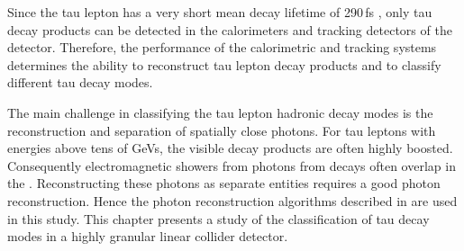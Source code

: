 Since the tau lepton has a very short mean decay lifetime of 290\,fs \cite{Abreu:1991jn}, only tau decay products can be detected in the calorimeters and tracking detectors of the \ILD detector. Therefore, the performance of the calorimetric and tracking systems determines the ability to reconstruct tau lepton decay products and to classify different tau decay modes.


The main challenge in classifying the tau lepton hadronic decay modes  is the reconstruction and  separation of spatially close photons. For  tau leptons with energies above tens of GeVs, the visible decay products are often highly boosted. Consequently electromagnetic showers from photons from \Ppizero decays often overlap in the \ECAL.  Reconstructing these photons as separate entities requires a good photon reconstruction. Hence the photon reconstruction algorithms described in  are used in this study. This chapter presents a study of the classification of tau decay modes in a highly granular linear collider detector.







%



